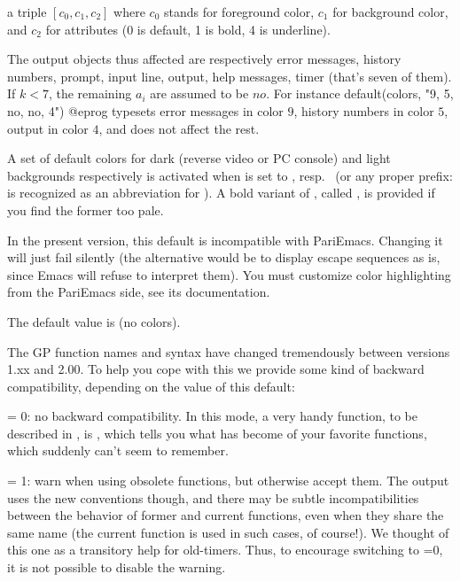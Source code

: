 \noindent\item a triple $[c_0,c_1,c_2]$ where $c_0$ stands for foreground
color, $c_1$ for background color, and $c_2$ for attributes (0 is default, 1
is bold, 4 is underline).

The output objects thus affected are respectively error messages,
history numbers, prompt, input line, output, help messages, timer (that's
seven of them). If $k < 7$, the remaining $a_i$ are assumed to be $no$. For
instance
%
\bprog
default(colors, "9, 5, no, no, 4")
@eprog
\noindent
typesets error messages in color $9$, history numbers in color $5$, output in
color $4$, and does not affect the rest.

A set of default colors for dark (reverse video or PC console) and light
backgrounds respectively is activated when  is set to
, resp.~ (or any proper prefix:  is
recognized as an abbreviation for ). A bold variant of
, called , is provided if you find the former too
pale.

\emacs In the present version, this default is incompatible with PariEmacs.
Changing it will just fail silently (the alternative would be to display
escape sequences as is, since Emacs will refuse to interpret them).
You must customize color highlighting from the PariEmacs side, see its
documentation.

The default value is  (no colors).

\label{se:def,compatible}
The GP function names and syntax
have changed tremendously between versions 1.xx and 2.00. To help you cope
with this we provide some kind of backward compatibility, depending on the
value of this default:

\quad {} = 0: no backward compatibility. In this mode, a very
handy function, to be described in , is ,
which tells you what has become of your favorite functions, which 
suddenly can't seem to remember.

\quad {} = 1: warn when using obsolete functions, but
otherwise accept them. The output uses the new conventions though, and
there may be subtle incompatibilities between the behavior of former and
current functions, even when they share the same name (the current function
is used in such cases, of course!). We thought of this one as a transitory
help for  old-timers. Thus, to encourage switching to =0,
it is not possible to disable the warning.

